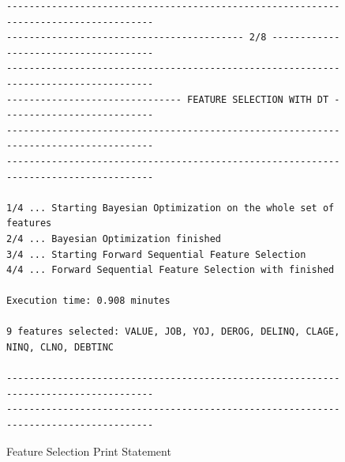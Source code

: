 \begin{figure}[H]
\centering\caption{Feature Selection Print Statement}
\label{fig:featselectprint}

{\fontsize{8.8}{11}\selectfont 
\begin{verbatim}
-------------------------------------------------------------------------------------
------------------------------------------ 2/8 --------------------------------------
-------------------------------------------------------------------------------------
------------------------------- FEATURE SELECTION WITH DT ---------------------------
-------------------------------------------------------------------------------------
------------------------------------------------------------------------------------- 

1/4 ... Starting Bayesian Optimization on the whole set of features
2/4 ... Bayesian Optimization finished
3/4 ... Starting Forward Sequential Feature Selection
4/4 ... Forward Sequential Feature Selection with finished 

Execution time: 0.908 minutes 

9 features selected: VALUE, JOB, YOJ, DEROG, DELINQ, CLAGE, NINQ, CLNO, DEBTINC 

-------------------------------------------------------------------------------------
-------------------------------------------------------------------------------------
\end{verbatim}
}
\vspace{0em}
\end{figure}


